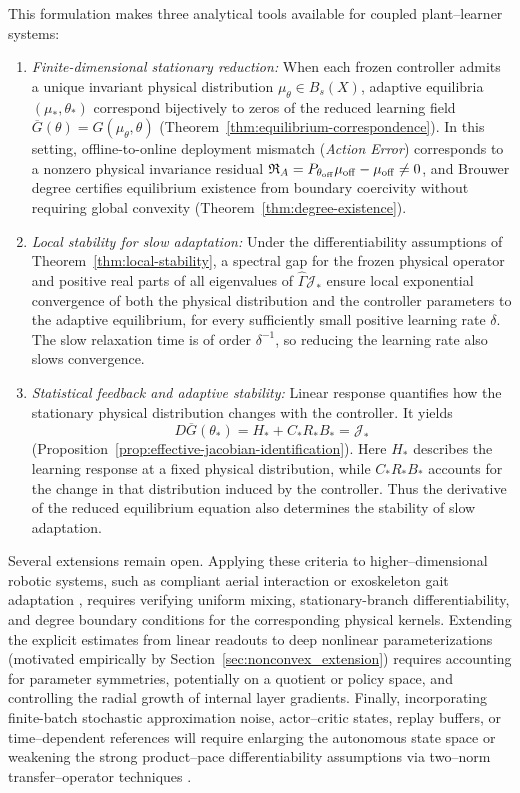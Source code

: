 \documentclass[11pt]{article}
\theoremstyle{definition}
\theoremstyle{remark}
\newcommand{\Gammahat}{\widehat{\Gamma}}
\begin{document}
{This formulation makes three analytical tools available for coupled plant--learner systems:
\begin{enumerate}[label=(\roman*)]
    \item \emph{Finite-dimensional stationary reduction:} When each frozen controller admits a unique invariant physical distribution $\mu_\theta \in B_s(X)$, adaptive equilibria $(\mu_*,\theta_*)$ correspond bijectively to zeros of the reduced learning field $\overline G(\theta) = G(\mu_\theta,\theta)$ (Theorem~\ref{thm:equilibrium-correspondence}). In this setting, offline-to-online deployment mismatch (\emph{Action Error}) corresponds to a nonzero physical invariance residual $\mathfrak R_A = P_{\theta_{\rm off}}\mu_{\rm off} - \mu_{\rm off} \neq 0$, and Brouwer degree certifies equilibrium existence from boundary coercivity without requiring global convexity (Theorem~\ref{thm:degree-existence}).
    \item 
\emph{Local stability for slow adaptation:}
Under the differentiability assumptions of
Theorem~\ref{thm:local-stability}, a spectral gap for
the frozen physical operator and positive real parts
of all eigenvalues of $\Gammahat\mathcal J_*$
ensure local exponential convergence of both the
physical distribution and the controller parameters
to the adaptive equilibrium, for every sufficiently
small positive learning rate $\delta$.
The slow relaxation time is of order $\delta^{-1}$,
so reducing the learning rate also slows convergence.
    \item
\emph{Statistical feedback and adaptive stability:}
Linear response quantifies how the stationary physical
distribution changes with the controller. It yields
\[
  D\overline G(\theta_*)
  =H_*+C_*R_*B_*=\mathcal J_*
\]
(Proposition~\ref{prop:effective-jacobian-identification}).
Here $H_*$ describes the learning response at a fixed
physical distribution, while $C_*R_*B_*$ accounts for
the change in that distribution induced by the controller.
Thus the derivative of the reduced equilibrium equation
also determines the stability of slow adaptation.
\end{enumerate}

Several extensions remain open. Applying these criteria to higher--dimensional robotic systems, such as compliant aerial interaction \cite{AuconePallottino2024,TognonPallottino2018} or exoskeleton gait adaptation \cite{lippi2021icinco}, requires verifying uniform mixing, stationary-branch differentiability, and degree boundary conditions for the corresponding physical kernels. Extending the explicit estimates from linear readouts to deep nonlinear parameterizations (motivated empirically by Section~\ref{sec:nonconvex_extension}) requires accounting for parameter symmetries, potentially on a quotient or policy space, and controlling the radial growth of internal layer gradients. Finally, incorporating finite-batch stochastic approximation noise, actor--critic states, replay buffers, or time--dependent references will require enlarging the autonomous state space or weakening the strong product--pace differentiability assumptions via two--norm transfer--operator techniques \cite{CastorriniGalatoloTanziJNS}.




}
\end{document}
